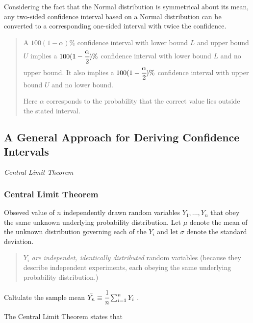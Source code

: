 Considering the fact that the Normal distribution is symmetrical about
its mean, any two-sided confidence interval based on a Normal
distribution can be converted to a corresponding one-sided interval with
twice the confidence.

\begin{quote}
A \(100(1-\alpha)\%\) confidence interval with lower bound \(L\) and
upper bound \(U\) implies a \(100(1-\cfrac{\alpha}{2})\%\) confidence
interval with lower bound \(L\) and no upper bound. It also implies a
\(100(1-\cfrac{\alpha}{2})\%\) confidence interval with upper bound
\(U\) and no lower bound.

Here \(\alpha\) corresponds to the probability that the correct value
lies outside the stated interval.
\end{quote}

\hypertarget{a-general-approach-for-deriving-confidence-intervals}{%
\subsection{A General Approach for Deriving Confidence
Intervals}\label{a-general-approach-for-deriving-confidence-intervals}}

\emph{Central Limit Theorem}

\hypertarget{central-limit-theorem-1}{%
\subsubsection{Central Limit Theorem}\label{central-limit-theorem-1}}

Obseved value of \(n\) independently drawn random variables
\(Y_1,...,Y_n\) that obey the same unknown underlying probability
distribution. Let \(\mu\) denote the mean of the unknown distribution
governing each of the \(Y_i\) and let \(\sigma\) denote the standard
deviation.

\begin{quote}
\(Y_i\) \emph{are independet, identically distributed} random variables
(because they describe independent experiments, each obeying the same
underlying probability distribution.)
\end{quote}

Caltulate the sample mean \(\bar{Y_n}\equiv\cfrac{1}{n}\sum^n_{i=1}Y_i\)
.

The Central Limit Theorem states that

